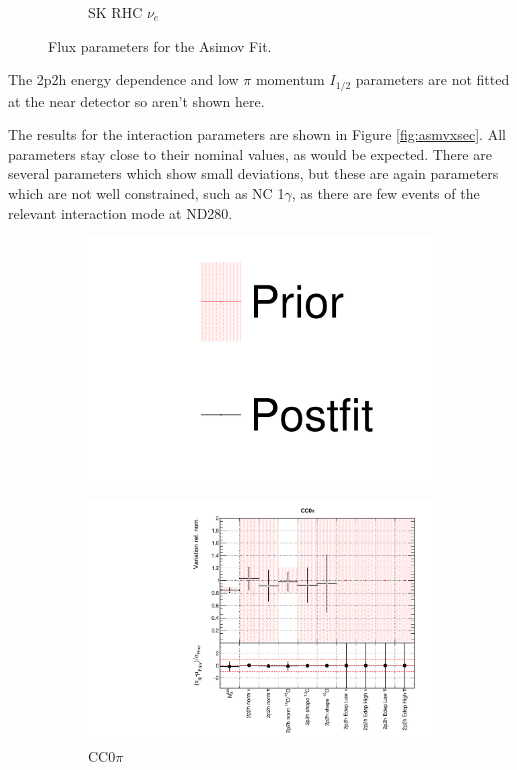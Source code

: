 \begin{figure}
\begin{subfigure}{0.24\textwidth}
  \caption{SK RHC $\nu_e$}
  \label{fig:}
\end{subfigure}
\caption{Flux parameters for the Asimov Fit.}
\label{fig:asmvfluxSK}
\end{figure}

The 2p2h energy dependence and low $\pi$ momentum $I_{1/2}$ parameters are not fitted at the near detector so aren't shown here.

The results for the interaction parameters are shown in Figure \ref{fig:asmvxsec}. All parameters stay close to their nominal values, as would be expected. There are several parameters which show small deviations, but these are again parameters which are not well constrained, such as NC 1$\gamma$, as there are few events of the relevant interaction mode at ND280.

\begin{figure}
\centering
\begin{subfigure}{0.95\textwidth}
  \centering
  \includegraphics[width=0.25\linewidth]{figs/asmv_leg}
  \caption{}
  \label{fig:}
\end{subfigure}
\begin{subfigure}{0.49\textwidth}
  \centering
  \includegraphics[width=0.95\linewidth]{figs/asmvxsec1}
  \caption{CC0$\pi$}
  \label{fig:}
\end{subfigure}
\begin{subfigure}{0.49\textwidth}
  \centering

\end{subfigure}
\end{figure}

